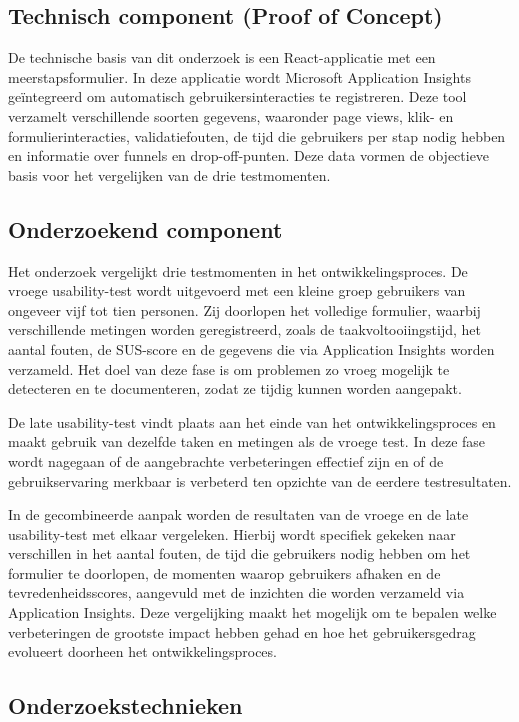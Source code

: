 \subsection{Technisch component (Proof of Concept)}

De technische basis van dit onderzoek is een React-applicatie met een meerstapsformulier. In deze applicatie wordt Microsoft Application Insights geïntegreerd om automatisch gebruikersinteracties te registreren. Deze tool verzamelt verschillende soorten gegevens, waaronder page views, klik- en formulierinteracties, validatiefouten, de tijd die gebruikers per stap nodig hebben en informatie over funnels en drop-off-punten. Deze data vormen de objectieve basis voor het vergelijken van de drie testmomenten.

\subsection{Onderzoekend component}

Het onderzoek vergelijkt drie testmomenten in het ontwikkelingsproces. De vroege usability-test wordt uitgevoerd met een kleine groep gebruikers van ongeveer vijf tot tien personen. Zij doorlopen het volledige formulier, waarbij verschillende metingen worden geregistreerd, zoals de taakvoltooiingstijd, het aantal fouten, de SUS-score en de gegevens die via Application Insights worden verzameld. Het doel van deze fase is om problemen zo vroeg mogelijk te detecteren en te documenteren, zodat ze tijdig kunnen worden aangepakt.

De late usability-test vindt plaats aan het einde van het ontwikkelingsproces en maakt gebruik van dezelfde taken en metingen als de vroege test. In deze fase wordt nagegaan of de aangebrachte verbeteringen effectief zijn en of de gebruikservaring merkbaar is verbeterd ten opzichte van de eerdere testresultaten.

In de gecombineerde aanpak worden de resultaten van de vroege en de late usability-test met elkaar vergeleken. Hierbij wordt specifiek gekeken naar verschillen in het aantal fouten, de tijd die gebruikers nodig hebben om het formulier te doorlopen, de momenten waarop gebruikers afhaken en de tevredenheidsscores, aangevuld met de inzichten die worden verzameld via Application Insights. Deze vergelijking maakt het mogelijk om te bepalen welke verbeteringen de grootste impact hebben gehad en hoe het gebruikersgedrag evolueert doorheen het ontwikkelingsproces.

\subsection{Onderzoekstechnieken}

